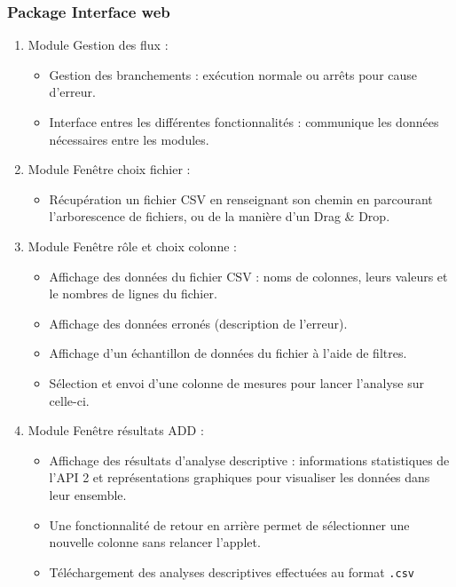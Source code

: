 			\subsubsection*{Package Interface web}
			\begin{enumerate}[leftmargin=*]
				\item Module Gestion des flux :
					\begin{itemize}[leftmargin=0.2cm]
					\item Gestion des branchements : exécution normale ou arrêts pour cause d'erreur.
					\item Interface entres les différentes fonctionnalités : communique les données nécessaires entre les modules.
					\end{itemize}
				\item Module Fenêtre choix fichier :
					\begin{itemize}[leftmargin=0.2cm]
					\item Récupération un fichier CSV en renseignant son chemin en parcourant l'arborescence de fichiers, ou de la manière d'un Drag \& Drop.
					\end{itemize}
				\item Module Fenêtre rôle et choix colonne :
					\begin{itemize}[leftmargin=0.2cm]
					\item Affichage des données du fichier CSV : noms de colonnes, leurs valeurs et le nombres de lignes du fichier.
					\item Affichage des données erronés (description de l'erreur).
					\item Affichage d'un échantillon de données du fichier à l'aide de filtres.
					\item Sélection et envoi d'une colonne de mesures pour lancer l'analyse sur celle-ci. 
					\end{itemize}
				\item Module Fenêtre résultats ADD :
					\begin{itemize}[leftmargin=0.2cm]
					\item Affichage des résultats d'analyse descriptive : informations statistiques de l'API 2 et représentations graphiques pour visualiser les données dans leur ensemble.
					\item Une fonctionnalité de retour en arrière permet de sélectionner une nouvelle colonne sans relancer l'applet.
					\item Téléchargement des analyses descriptives effectuées au format \lstinline!.csv!
					\end{itemize}
				\end{enumerate}
		
